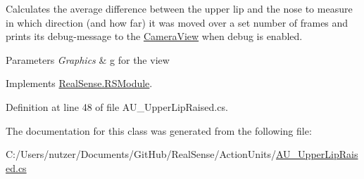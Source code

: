 Calculates the average difference between the upper lip and the nose to measure in which direction (and how far) it was moved over a set number of frames and prints its\textquotesingle{} debug-\/message to the \hyperlink{class_real_sense_1_1_camera_view}{Camera\+View} when debug is enabled. 
\begin{DoxyParams}{Parameters}
{\em Graphics} & g for the view \\
\hline
\end{DoxyParams}


Implements \hyperlink{class_real_sense_1_1_r_s_module_a2ec830b7932ee7c0077d473f81c73867}{Real\+Sense.\+R\+S\+Module}.



Definition at line 48 of file A\+U\+\_\+\+Upper\+Lip\+Raised.\+cs.



The documentation for this class was generated from the following file\+:\begin{DoxyCompactItemize}
\item 
C\+:/\+Users/nutzer/\+Documents/\+Git\+Hub/\+Real\+Sense/\+Action\+Units/\hyperlink{_a_u___upper_lip_raised_8cs}{A\+U\+\_\+\+Upper\+Lip\+Raised.\+cs}\end{DoxyCompactItemize}

